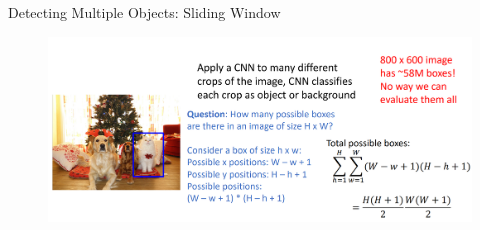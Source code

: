 \begin{frame}[allowframebreaks]{Detecting Multiple Objects: Sliding Window}
\framebreak

\begin{figure}
\centering
\includegraphics[width=1.0\textwidth,height=1.0\textheight,keepaspectratio]{images/obj-det/object_16.png}
\end{figure}

\framebreak
\begin{block}{}
    
\end{block}

\end{frame}